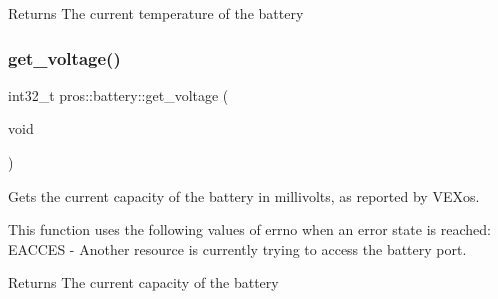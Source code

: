 \begin{DoxyReturn}{Returns}
The current temperature of the battery 
\end{DoxyReturn}
\mbox{\label{namespacepros_1_1battery_a2c325b346f66c15ca7e5a844a66b20d9}} 
\subsubsection{\texorpdfstring{get\+\_\+voltage()}{get\_voltage()}}
{\footnotesize\ttfamily int32\+\_\+t pros\+::battery\+::get\+\_\+voltage (\begin{DoxyParamCaption}\item[{void}]{ }\end{DoxyParamCaption})}

Gets the current capacity of the battery in millivolts, as reported by V\+E\+Xos.

This function uses the following values of errno when an error state is reached\+: E\+A\+C\+C\+ES -\/ Another resource is currently trying to access the battery port.

\begin{DoxyReturn}{Returns}
The current capacity of the battery 
\end{DoxyReturn}
